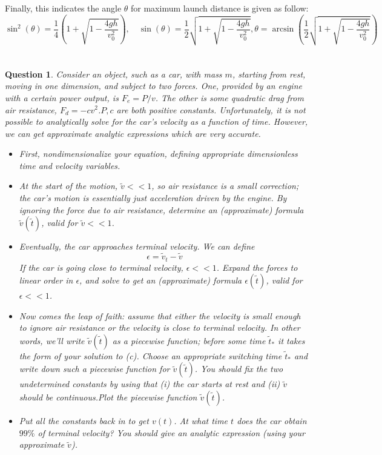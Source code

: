 \documentclass{article}
\newtheorem{question}{Question}
\begin{document}
Finally, this indicates the angle $\theta$ for maximum launch distance is given as follow:
$$\sin^2(\theta)=\frac{1}{4}\left(1+\sqrt{1-\frac{4gh}{v_0^2}}\right),\quad \sin(\theta)=\frac{1}{2}\sqrt{1+\sqrt{1-\frac{4gh}{v_0^2}}}, \theta = \arcsin\left(\frac{1}{2}\sqrt{1+\sqrt{1-\frac{4gh}{v_0^2}}}\right)$$

\break

\section{}%
\begin{question}\label{q3}
    Consider an object, such as a car, with mass $m$, starting from rest, moving in one dimension, and subject to two forces. One, provided by an engine with a certain power output, is $F_e = P/v$. The other is some quadratic drag from air resistance, $F_d = -cv^2$.$P,c$ are both positive constants. Unfortunately, it is not possible to analytically solve for the car's velocity as a function of time. However, we can get approximate analytic expressions which are very accurate.
    \begin{itemize}
        \item[(a)] First, nondimensionalize your equation, defining appropriate dimensionless time and velocity variables.
        \item[(b)] At the start of the motion, $\tilde{v}<< 1$, so air resistance is a small correction; the car's motion is essentially just acceleration driven by the engine. By ignoring the force due to air resistance, determine an (approximate) formula $\tilde{v}(\tilde{t})$, valid for $\tilde{v}<<1$.
        \item[(c)]Eventually, the car approaches terminal velocity. We can define 
        $$\epsilon = \tilde{v}_t-\tilde{v}$$
        If the car is going close to terminal velocity, $\epsilon <<1$. Expand the forces to linear order in $\epsilon$, and solve to get an (approximate) formula $\epsilon(\tilde{t})$, valid for $\epsilon<<1$.
        \item[(d)] Now comes the leap of faith: assume that either the velocity is small enough to ignore air resistance or the velocity is close to terminal velocity. In other words, we'll write $\tilde{v}(\tilde{t})$ as a piecewise function; before some time $\tilde{t}_*$ it takes the form of your solution to (c). Choose an appropriate switching time $\tilde{t}_*$ and write down such a piecewise function for $\tilde{v}(\tilde{t})$. You should fix the two undetermined constants by using that (i) the car starts at rest and (ii) $\tilde{v}$ should be continuous.Plot the piecewise function $\tilde{v}(\tilde{t})$.
        \item[(e)] Put all the constants back in to get $v(t)$. At what time $t$ does the car obtain $99\%$ of terminal velocity? You should give an analytic expression (using your approximate $\tilde{v}$). 
    \end{itemize}
\end{question}
\end{document}
